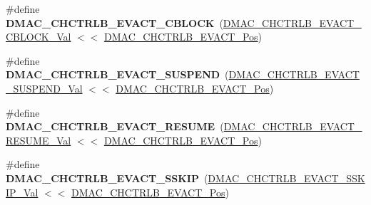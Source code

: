 \begin{DoxyCompactItemize}
\item 
\hypertarget{group___s_a_m_l21___d_m_a_c_ga0e602e4e69b117845a5bfa2d76f60b6b}{}\#define {\bfseries D\+M\+A\+C\+\_\+\+C\+H\+C\+T\+R\+L\+B\+\_\+\+E\+V\+A\+C\+T\+\_\+\+C\+B\+L\+O\+C\+K}~(\hyperlink{group___s_a_m_l21___d_m_a_c_ga87b04d4f4a880d5fab6638ae0281a535}{D\+M\+A\+C\+\_\+\+C\+H\+C\+T\+R\+L\+B\+\_\+\+E\+V\+A\+C\+T\+\_\+\+C\+B\+L\+O\+C\+K\+\_\+\+Val} $<$$<$ \hyperlink{group___s_a_m_l21___d_m_a_c_ga5d582eee4f8e2bfd97709b103da6830e}{D\+M\+A\+C\+\_\+\+C\+H\+C\+T\+R\+L\+B\+\_\+\+E\+V\+A\+C\+T\+\_\+\+Pos})\label{group___s_a_m_l21___d_m_a_c_ga0e602e4e69b117845a5bfa2d76f60b6b}

\item 
\hypertarget{group___s_a_m_l21___d_m_a_c_ga73058a9110042dba77ec380835175d31}{}\#define {\bfseries D\+M\+A\+C\+\_\+\+C\+H\+C\+T\+R\+L\+B\+\_\+\+E\+V\+A\+C\+T\+\_\+\+S\+U\+S\+P\+E\+N\+D}~(\hyperlink{group___s_a_m_l21___d_m_a_c_gacb1322d1f22aee0ec2daecb1c51dbbc4}{D\+M\+A\+C\+\_\+\+C\+H\+C\+T\+R\+L\+B\+\_\+\+E\+V\+A\+C\+T\+\_\+\+S\+U\+S\+P\+E\+N\+D\+\_\+\+Val} $<$$<$ \hyperlink{group___s_a_m_l21___d_m_a_c_ga5d582eee4f8e2bfd97709b103da6830e}{D\+M\+A\+C\+\_\+\+C\+H\+C\+T\+R\+L\+B\+\_\+\+E\+V\+A\+C\+T\+\_\+\+Pos})\label{group___s_a_m_l21___d_m_a_c_ga73058a9110042dba77ec380835175d31}

\item 
\hypertarget{group___s_a_m_l21___d_m_a_c_ga142282abf36b287ab0f7ebc4f4d9e4c3}{}\#define {\bfseries D\+M\+A\+C\+\_\+\+C\+H\+C\+T\+R\+L\+B\+\_\+\+E\+V\+A\+C\+T\+\_\+\+R\+E\+S\+U\+M\+E}~(\hyperlink{group___s_a_m_l21___d_m_a_c_ga7356b082779dc3467dd5003f8ed8c01b}{D\+M\+A\+C\+\_\+\+C\+H\+C\+T\+R\+L\+B\+\_\+\+E\+V\+A\+C\+T\+\_\+\+R\+E\+S\+U\+M\+E\+\_\+\+Val} $<$$<$ \hyperlink{group___s_a_m_l21___d_m_a_c_ga5d582eee4f8e2bfd97709b103da6830e}{D\+M\+A\+C\+\_\+\+C\+H\+C\+T\+R\+L\+B\+\_\+\+E\+V\+A\+C\+T\+\_\+\+Pos})\label{group___s_a_m_l21___d_m_a_c_ga142282abf36b287ab0f7ebc4f4d9e4c3}

\item 
\hypertarget{group___s_a_m_l21___d_m_a_c_ga3a7bfa7bd0e91711566d3a12f150f678}{}\#define {\bfseries D\+M\+A\+C\+\_\+\+C\+H\+C\+T\+R\+L\+B\+\_\+\+E\+V\+A\+C\+T\+\_\+\+S\+S\+K\+I\+P}~(\hyperlink{group___s_a_m_l21___d_m_a_c_ga30fe7c169fb72d0ba2f073769858069a}{D\+M\+A\+C\+\_\+\+C\+H\+C\+T\+R\+L\+B\+\_\+\+E\+V\+A\+C\+T\+\_\+\+S\+S\+K\+I\+P\+\_\+\+Val}  $<$$<$ \hyperlink{group___s_a_m_l21___d_m_a_c_ga5d582eee4f8e2bfd97709b103da6830e}{D\+M\+A\+C\+\_\+\+C\+H\+C\+T\+R\+L\+B\+\_\+\+E\+V\+A\+C\+T\+\_\+\+Pos})\label{group___s_a_m_l21___d_m_a_c_ga3a7bfa7bd0e91711566d3a12f150f678}


\end{DoxyCompactItemize}

